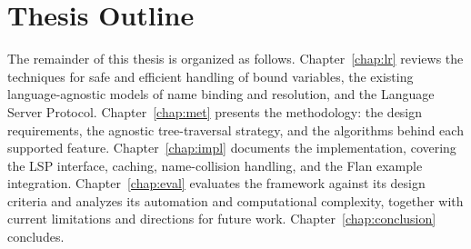 \section{Thesis Outline}
\label{sec:outline}

The remainder of this thesis is organized as follows. 
Chapter~\ref{chap:lr} reviews the techniques for safe and efficient handling of bound variables, the existing language-agnostic models of name binding and resolution, and the Language Server Protocol. 
Chapter~\ref{chap:met} presents the methodology: the design requirements, the agnostic tree-traversal strategy, and the algorithms behind each supported feature. 
Chapter~\ref{chap:impl} documents the implementation, covering the LSP interface, caching, name-collision handling, and the Flan example integration. 
Chapter~\ref{chap:eval} evaluates the framework against its design criteria and analyzes its automation and computational complexity, together with current limitations and directions for future work. 
Chapter~\ref{chap:conclusion} concludes.
